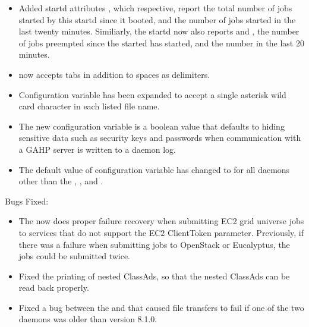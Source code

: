 \begin{itemize}

\item Added startd attributes ,  which respective, report
the total number of jobs started by this startd since it booted, and the number of jobs started in the
last twenty minutes.  Similiarly, the startd now also reports  and
, the number of jobs preempted since the started has started, and
the number in the last 20 minutes.

\item {} now accepts tabs in addition to spaces as delimiters.

\item Configuration variable  has been expanded
to accept a single asterisk wild card character in each listed file name.

\item The new configuration variable 
is a boolean value that defaults to hiding sensitive data 
such as security keys and passwords
when communication with a GAHP server is written to a daemon log.

\item The default value of configuration variable 
 has changed to  for all
daemons other than the , , and .

\end{itemize}

\noindent Bugs Fixed:

\begin{itemize}

\item The  now does proper failure recovery when
submitting EC2 grid universe jobs to services that do not support 
the EC2 ClientToken parameter.
Previously, if there was a failure when submitting jobs to OpenStack
or Eucalyptus, the jobs could be submitted twice.

\item Fixed the printing of nested ClassAds, so that the nested ClassAds
can be read back properly.

\item Fixed a bug between the  and 
that caused file transfers to fail if one of the two daemons was older
than version 8.1.0.

\end{itemize}

